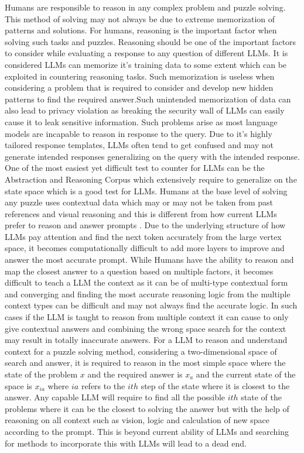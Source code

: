 \documentclass[pdflatex,sn-mathphys-num]{sn-jnl}%
\theoremstyle{thmstyleone}%
\theoremstyle{thmstyletwo}%
\theoremstyle{thmstylethree}%
\begin{document}
Humans are responsible to reason in any complex problem and puzzle solving\cite{humanreasoning}. This method of solving may not always be due to extreme memorization of patterns and solutions. For humans, reasoning is the important factor when solving such tasks and puzzles. Reasoning should be one of the important factors to consider while evaluating a response to any question of different LLMs. It is considered LLMs can memorize it's training data to some extent\cite{bib5} which can be exploited in countering reasoning tasks. Such memorization is useless when considering a problem that is required to consider and develop new hidden patterns to find the required answer.Such unintended memorization of data can also lead to privacy violation as breaking the security wall of LLMs can easily cause it to leak sensitive information. Such problems arise as most language models are incapable to reason in response to the query. Due to it's highly tailored response templates, LLMs often tend to get confused and may not generate intended responses generalizing on the query with the intended response. One of the most easiest yet difficult test to counter for LLMs can be the Abstraction and Reasoning Corpus \cite{bib6} which extensively require to generalize on the state space which is a good test for LLMs. Humans at the base level of solving any puzzle uses contextual data which may or may not be taken from past references and visual reasoning and this is different from how current LLMs prefer to reason and answer prompts \cite{HAN2024101155}. Due to the underlying structure of how LLMs pay attention and find the next token accurately from the large vertex space, it becomes computationally difficult to add more layers to improve and answer the most accurate prompt. While Humans have the ability to reason and map the closest answer to a question based on multiple factors, it becomes difficult to teach a LLM the context as it can be of multi-type contextual form and converging and finding the most accurate reasoning logic from the multiple context types can be difficult and may not always find the accurate logic. In such cases if the LLM is taught to reason from multiple context it can cause to only give contextual answers and combining the wrong space search for the context may result in totally inaccurate answers. For a LLM to reason and understand context for a puzzle solving method, considering a two-dimensional space of search and answer, it is required to reason in the most simple space where the state of the problem $x$ and the required answer is $x_a$ and the current state of the space is $x_{ia}$ where $ia$ refers to the $ith$ step of the state where it is closest to the answer. Any capable LLM will require to find all the possible $ith$ state of the problems where it can be the closest to solving the answer but with the help of reasoning on all context such as vision, logic and calculation of new space according to the prompt. This is beyond current ability of LLMs and searching for methods to incorporate this with LLMs will lead to a dead end\cite{freethinkblog}.
\end{document}
